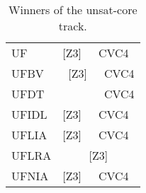 \begin{table}[]
\begin{center}
{\begin{tabular}{lccc}
\multicolumn{1}{l|}{UF}         & \multicolumn{1}{c|}{{[}Z3{]}}      & \multicolumn{2}{c|}{CVC4}                                                    \\ \cline{2-4} 
\multicolumn{1}{l|}{UFBV}       & \multicolumn{2}{c|}{{[}Z3{]}}                                                  & \multicolumn{1}{c|}{CVC4}        \\ \cline{2-4} 
UFDT                            & \multicolumn{1}{l}{}               & \multicolumn{1}{l|}{}                     & \multicolumn{1}{c|}{CVC4}        \\ \cline{2-4} 
\multicolumn{1}{l|}{UFIDL}      & \multicolumn{1}{c|}{{[}Z3{]}}      & \multicolumn{2}{c|}{CVC4}                                                    \\ \cline{2-4} 
\multicolumn{1}{l|}{UFLIA}      & \multicolumn{1}{c|}{{[}Z3{]}}      & \multicolumn{2}{c|}{CVC4}                                                    \\ \cline{2-4} 
\multicolumn{1}{l|}{UFLRA}      & \multicolumn{3}{c|}{{[}Z3{]}}                                                                                     \\ \cline{2-4} 
\multicolumn{1}{l|}{UFNIA}      & \multicolumn{1}{c|}{{[}Z3{]}}      & \multicolumn{2}{c|}{CVC4}                                                    \\ \cline{2-4} 
\end{tabular}}
\end{center}
\caption{\label{tab:winners-unsat-core} Winners of the unsat-core track.}
\end{table}
